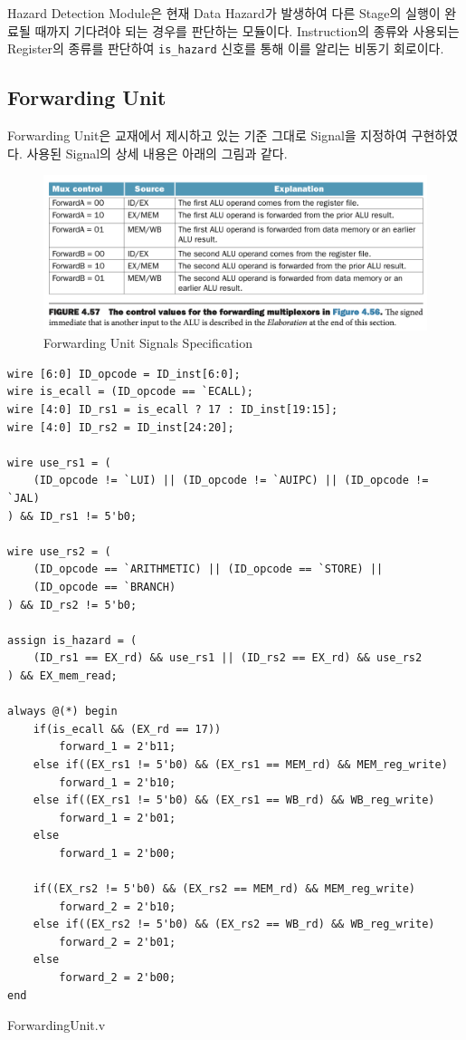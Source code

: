 \documentclass[openright, a4paper]{article}
\newcommand{\code}[1]{\texttt{#1}}
\newenvironment{longlisting}{\captionsetup{type=listing}}{}
\begin{document}
Hazard Detection Module은 현재 Data Hazard가 발생하여 다른 Stage의 실행이 완료될 때까지 기다려야 되는 경우를 판단하는 모듈이다. Instruction의 종류와 사용되는 Register의 종류를 판단하여 \code{is_hazard} 신호를 통해 이를 알리는 비동기 회로이다.

\subsection{Forwarding Unit}

Forwarding Unit은 교재에서 제시하고 있는 기준 그대로 Signal을 지정하여 구현하였다. 사용된 Signal의 상세 내용은 아래의 그림과 같다.

\begin{figure}[!h]
    \centering
    \includegraphics[width=\linewidth]{img/forwarding-unit-signals.png}
    \caption{Forwarding Unit Signals Specification}
\end{figure}

\begin{longlisting}
    \begin{verbatim}
wire [6:0] ID_opcode = ID_inst[6:0];
wire is_ecall = (ID_opcode == `ECALL);
wire [4:0] ID_rs1 = is_ecall ? 17 : ID_inst[19:15];
wire [4:0] ID_rs2 = ID_inst[24:20];

wire use_rs1 = (
    (ID_opcode != `LUI) || (ID_opcode != `AUIPC) || (ID_opcode != `JAL)
) && ID_rs1 != 5'b0; 

wire use_rs2 = (
    (ID_opcode == `ARITHMETIC) || (ID_opcode == `STORE) ||
    (ID_opcode == `BRANCH)
) && ID_rs2 != 5'b0;

assign is_hazard = (
    (ID_rs1 == EX_rd) && use_rs1 || (ID_rs2 == EX_rd) && use_rs2 
) && EX_mem_read;

always @(*) begin
    if(is_ecall && (EX_rd == 17))
        forward_1 = 2'b11;
    else if((EX_rs1 != 5'b0) && (EX_rs1 == MEM_rd) && MEM_reg_write)
        forward_1 = 2'b10;
    else if((EX_rs1 != 5'b0) && (EX_rs1 == WB_rd) && WB_reg_write)
        forward_1 = 2'b01;
    else
        forward_1 = 2'b00;

    if((EX_rs2 != 5'b0) && (EX_rs2 == MEM_rd) && MEM_reg_write)
        forward_2 = 2'b10;
    else if((EX_rs2 != 5'b0) && (EX_rs2 == WB_rd) && WB_reg_write)
        forward_2 = 2'b01;
    else
        forward_2 = 2'b00;
end
    \end{verbatim}
    \caption{ForwardingUnit.v}
\end{longlisting}
\end{document}
